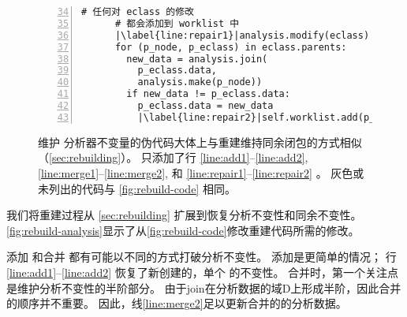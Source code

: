 \begin{figure}
\begin{minipage}[t]{0.47\linewidth}
\begin{lstlisting}[gobble=4, numbers=left, firstnumber=34, basicstyle=\scriptsize\ttfamily, escapechar=|]
      # 任何对 eclass 的修改
      # 都会添加到 worklist 中
      |\label{line:repair1}|analysis.modify(eclass)
      for (p_node, p_eclass) in eclass.parents:
        new_data = analysis.join(
          p_eclass.data,
          analysis.make(p_node))
        if new_data != p_eclass.data:
          p_eclass.data = new_data
          |\label{line:repair2}|self.worklist.add(p_eclass)
    \end{lstlisting}
  \end{minipage}
  \caption{
    维护 \eclass 分析器不变量的伪代码大体上与重建维持同余闭包的方式相似（\autoref{sec:rebuilding}）。
      只添加了行 \ref{line:add1}--\ref{line:add2},
      \ref{line:merge1}--\ref{line:merge2},
      和 \ref{line:repair1}--\ref{line:repair2} 。
    灰色或未列出的代码与 \autoref{fig:rebuild-code} 相同。
  }
  \label{fig:rebuild-analysis}
\end{figure}

我们将重建过程从 \autoref{sec:rebuilding} 扩展到恢复分析不变性和同余不变性。
\autoref{fig:rebuild-analysis}显示了从\autoref{fig:rebuild-code}修改重建代码所需的修改。


添加 \enodes 和合并 \eclasses 都有可能以不同的方式打破分析不变性。
添加\enodes 是更简单的情况；
  行 \ref{line:add1}--\ref{line:add2} 恢复了新创建的，单个 \eclass 的不变性。%
合并\enodes 时，第一个关注点是维护分析不变性的半阶部分。
由于\textsf{join}在分析数据的域D上形成半阶，因此合并的顺序并不重要。
因此，线\ref{line:merge2}足以更新合并的\eclass 的分析数据。


